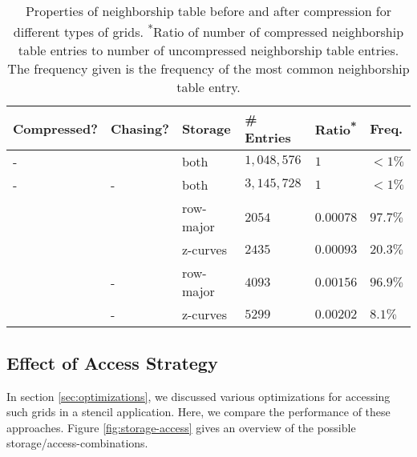 \begin{table}
	\begin{tabular}{l l l l l l}
		\hline
		Compressed? & Chasing? & Storage & \# Entries & Ratio\textsuperscript{*} & Freq.\textsuperscript{\dag} \\
		\hline
		- & \checkmark & both & $1,048,576$ & $1$ & $<1\%$\\
		- & - & both & $3,145,728$ & $1$ & $<1\%$\\
		\checkmark & \checkmark & row-major & $2054$ & $0.00078$ & $97.7\%$ \\
		\checkmark & \checkmark & z-curves & $2435$ & $0.00093$ & $20.3\%$ \\
		\checkmark & - & row-major & $4093$ & $0.00156$ & $96.9\%$ \\
		\checkmark & - & z-curves & $5299$ & $0.00202$ & $8.1\%$ \\
		\hline
	\end{tabular}
	\caption{\label{tab:compression} Properties of neighborship table before and after compression for different types of grids. \textsuperscript{*}Ratio of number of compressed neighborship table entries to number of uncompressed neighborship table entries. \textsuperscript{\dag}The frequency given is the frequency of the most common neighborship table entry. }
\end{table}


\subsection{Effect of Access Strategy} \label{sec:res-access}

In section \ref{sec:optimizations}, we discussed various optimizations for accessing such grids in a stencil application. Here, we compare the performance of these approaches. Figure \ref{fig:storage-access} gives an overview of the possible storage/access-combinations.

